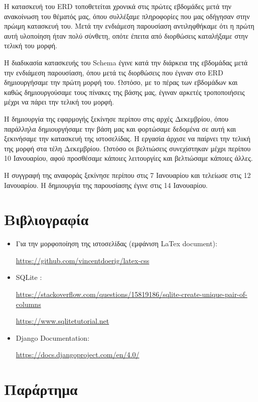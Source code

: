\documentclass[manuscript,screen,review]{acmart}
\newcommand{\en}[1]{\foreignlanguage{english}{#1}}
\begin{document}
Η κατασκευή του \en{ERD} τοποθετείται χρονικά στις πρώτες εβδομάδες μετά την ανακοίνωση του θέματός μας, όπου συλλέξαμε πληροφορίες που μας οδήγησαν στην πρώιμη κατασκευή του. Μετά την ενδιάμεση παρουσίαση αντιληφθήκαμε ότι η πρώτη αυτή υλοποίηση ήταν πολύ σύνθετη, οπότε έπειτα από διορθώσεις καταλήξαμε στην τελική του μορφή.

H διαδικασία κατασκευής του \en{Schema} έγινε κατά την διάρκεια της εβδομάδας μετά την ενδιάμεση παρουσίαση, όπου μετά τις διορθώσεις που έγιναν στο \en{ERD} δημιουργήσαμε την πρώτη μορφή του. Ωστόσο, με το πέρας των εβδομάδων και καθώς δημιουργούσαμε τους πίνακες της βάσης μας, έγιναν αρκετές τροποποιήσεις μέχρι να πάρει την τελική του μορφή.

Η δημιουργία της εφαρμογής ξεκίνησε περίπου στις αρχές Δεκεμβρίου, όπου παράλληλα δημιουργήσαμε την βάση μας και φορτώσαμε δεδομένα σε αυτή και ξεκινήσαμε την κατασκευή της ιστοσελίδας.
Η εργασία άρχισε να παίρνει την τελική της μορφή στα τέλη Δεκεμβρίου. Ωστόσο οι βελτιώσεις συνεχίστηκαν μέχρι περίπου 10 Ιανουαρίου, αφού προσθέσαμε κάποιες λειτουργίες και βελτιώσαμε κάποιες άλλες.

Η συγγραφή της αναφοράς ξεκίνησε περίπου στις 7 Ιανουαρίου και τελείωσε στις 12
Ιανουαρίου. H δημιουργία της παρουσίασης έγινε στις 14 Ιανουαρίου.

\section{Βιβλιογραφία}
\begin{itemize}
    \item Για την μορφοποίηση της ιστοσελίδας (εμφάνιση \en{LaTex document}): 
    
    \en{\url{https://github.com/vincentdoerig/latex-css}}
    \item \en{SQLite }:
    
    \en{\url{https://stackoverflow.com/questions/15819186/sqlite-create-unique-pair-of-columns}}
    
    \en{\url{ https://www.sqlitetutorial.net}}
    
    \item \en{Django Documentation}:
    
    \en{\url{https://docs.djangoproject.com/en/4.0/}}
\end{itemize}

\newpage
\section{Παράρτημα}
\end{document}
